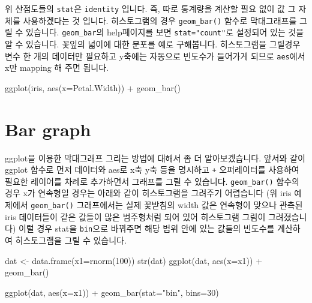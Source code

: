 \documentclass[
]{book}
\newenvironment{Shaded}{\begin{snugshade}}{\end{snugshade}}
\newcommand{\AttributeTok}[1]{\textcolor[rgb]{0.77,0.63,0.00}{#1}}
\newcommand{\DecValTok}[1]{\textcolor[rgb]{0.00,0.00,0.81}{#1}}
\newcommand{\FunctionTok}[1]{\textcolor[rgb]{0.00,0.00,0.00}{#1}}
\newcommand{\NormalTok}[1]{#1}
\newcommand{\OtherTok}[1]{\textcolor[rgb]{0.56,0.35,0.01}{#1}}
\newcommand{\SpecialCharTok}[1]{\textcolor[rgb]{0.00,0.00,0.00}{#1}}
\newcommand{\StringTok}[1]{\textcolor[rgb]{0.31,0.60,0.02}{#1}}
\begin{document}
위 산점도들의 \texttt{stat}은 \texttt{identity} 입니다. 즉, 따로 통계량을 계산할 필요 없이 값 그 자체를 사용하겠다는 것 입니다. 히스토그램의 경우 \texttt{geom\_bar()} 함수로 막대그래프를 그릴 수 있습니다. \texttt{geom\_bar}의 help페이지를 보면 \texttt{stat="count"}로 설정되어 있는 것을 알 수 있습니다. 꽃잎의 넓이에 대한 분포를 예로 구해봅니다. 히스토그램을 그릴경우 변수 한 개의 데이터만 필요하고 y축에는 자동으로 빈도수가 들어가게 되므로 \texttt{aes}에서 x만 mapping 해 주면 됩니다.

\begin{Shaded}
\begin{Highlighting}[]
\FunctionTok{ggplot}\NormalTok{(iris, }\FunctionTok{aes}\NormalTok{(}\AttributeTok{x=}\NormalTok{Petal.Width)) }\SpecialCharTok{+}  
  \FunctionTok{geom\_bar}\NormalTok{()}
\end{Highlighting}
\end{Shaded}

\hypertarget{bar-graph}{%
\section{Bar graph}\label{bar-graph}}

ggplot을 이용한 막대그래프 그리는 방법에 대해서 좀 더 알아보겠습니다. 앞서와 같이 ggplot 함수로 먼저 데이터와 aes로 x축 y축 등을 명시하고 \texttt{+} 오퍼레이터를 사용하여 필요한 레이어를 차례로 추가하면서 그래프를 그릴 수 있습니다. \texttt{geom\_bar()} 함수의 경우 x가 연속형일 경우는 아래와 같이 히스토그램을 그려주기 어렵습니다 (위 iris 예제에서 \texttt{geom\_bar()} 그래프에서는 실제 꽃받침의 width 값은 연속형이 맞으나 관측된 iris 데이터들이 같은 값들이 많은 범주형처럼 되어 있어 히스토그램 그림이 그려졌습니다) 이럴 경우 stat을 \texttt{bin}으로 바꿔주면 해당 범위 안에 있는 값들의 빈도수를 계산하여 히스토그램을 그릴 수 있습니다.

\begin{Shaded}
\begin{Highlighting}[]
\NormalTok{dat }\OtherTok{\textless{}{-}} \FunctionTok{data.frame}\NormalTok{(}\AttributeTok{x1=}\FunctionTok{rnorm}\NormalTok{(}\DecValTok{100}\NormalTok{))}
\FunctionTok{str}\NormalTok{(dat)}
\FunctionTok{ggplot}\NormalTok{(dat, }\FunctionTok{aes}\NormalTok{(}\AttributeTok{x=}\NormalTok{x1)) }\SpecialCharTok{+}
  \FunctionTok{geom\_bar}\NormalTok{()}

\FunctionTok{ggplot}\NormalTok{(dat, }\FunctionTok{aes}\NormalTok{(}\AttributeTok{x=}\NormalTok{x1)) }\SpecialCharTok{+}
  \FunctionTok{geom\_bar}\NormalTok{(}\AttributeTok{stat=}\StringTok{"bin"}\NormalTok{, }\AttributeTok{bins=}\DecValTok{30}\NormalTok{)}
\end{Highlighting}
\end{Shaded}
\end{document}

